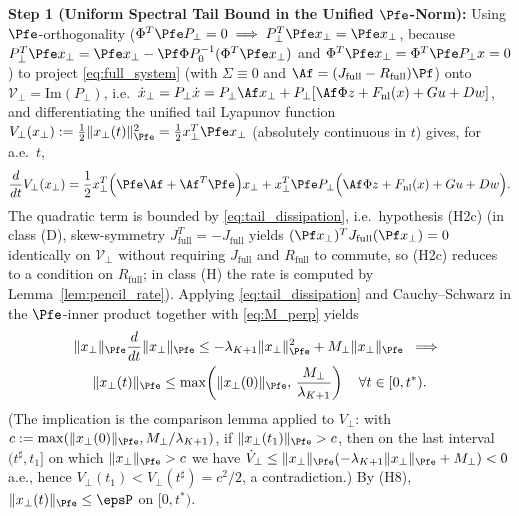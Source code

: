 \textbf{Step 1 (Uniform Spectral Tail Bound in the Unified \(\Pfe\)-Norm):} Using \(\Pfe\)-orthogonality (\(\Phi^T \Pfe P_\perp = 0 \implies P_\perp^T \Pfe x_\perp = \Pfe x_\perp\), because \(P_\perp^T\Pfe x_\perp = \Pfe x_\perp - \Pf\Phi P_0^{-1}(\Phi^T\Pfe x_\perp)\) and \(\Phi^T\Pfe x_\perp = \Phi^T\Pfe P_\perp x = 0\)) to project \eqref{eq:full_system} (with \(\Sigma \equiv 0\) and \(\Af = (J_{\mathrm{full}} - R_{\mathrm{full}})\Pf\)) onto \(\mathcal{V}_\perp = \mathrm{Im}(P_\perp)\), i.e.\ \(\dot x_\perp = P_\perp\dot x = P_\perp\Af x_\perp + P_\perp[\Af\Phi z + F_{\mathrm{nl}}(x) + Gu + Dw]\), and differentiating the unified tail Lyapunov function \(V_\perp(x_\perp) := \frac{1}{2}\|x_\perp(t)\|_{\Pfe}^2 = \frac{1}{2}x_\perp^T \Pfe x_\perp\) (absolutely continuous in \(t\)) gives, for a.e.\ \(t\),
\[
\frac{d}{dt}V_\perp(x_\perp) = \frac{1}{2}x_\perp^T \Big(\Pfe \Af + \Af^T \Pfe\Big) x_\perp + x_\perp^T \Pfe P_\perp\Big(\Af\Phi z + F_{\mathrm{nl}}(x) + Gu + Dw\Big).
\]
The quadratic term is bounded by \eqref{eq:tail_dissipation}, i.e.\ hypothesis (H2c) (in class (D), skew-symmetry \(J_{\mathrm{full}}^T = -J_{\mathrm{full}}\) yields \((\Pf x_\perp)^T J_{\mathrm{full}} (\Pf x_\perp) = 0\) identically on \(\mathcal{V}_\perp\) without requiring \(J_{\mathrm{full}}\) and \(R_{\mathrm{full}}\) to commute, so (H2c) reduces to a condition on \(R_{\mathrm{full}}\); in class (H) the rate is computed by Lemma~\ref{lem:pencil_rate}). Applying \eqref{eq:tail_dissipation} and Cauchy--Schwarz in the \(\Pfe\)-inner product together with \eqref{eq:M_perp} yields
\begin{multline*}
\|x_\perp\|_{\Pfe}\frac{d}{dt}\|x_\perp\|_{\Pfe} \le -\lambda_{K+1}\|x_\perp\|_{\Pfe}^2 + M_\perp \|x_\perp\|_{\Pfe} \;\implies\; \\ \|x_\perp(t)\|_{\Pfe} \le \max\!\left(\|x_\perp(0)\|_{\Pfe},\, \frac{M_\perp}{\lambda_{K+1}}\right) \quad \forall t \in [0,t^*).
\end{multline*}
(The implication is the comparison lemma applied to \(V_\perp\): with \(c := \max(\|x_\perp(0)\|_{\Pfe}, M_\perp/\lambda_{K+1})\), if \(\|x_\perp(t_1)\|_{\Pfe} > c\), then on the last interval \((t^\sharp, t_1]\) on which \(\|x_\perp\|_{\Pfe} > c\) we have \(\dot V_\perp \le \|x_\perp\|_{\Pfe}(-\lambda_{K+1}\|x_\perp\|_{\Pfe} + M_\perp) < 0\) a.e., hence \(V_\perp(t_1) < V_\perp(t^\sharp) = c^2/2\), a contradiction.) By (H8), \(\|x_\perp(t)\|_{\Pfe} \le \epsP\) on \([0, t^*)\).


